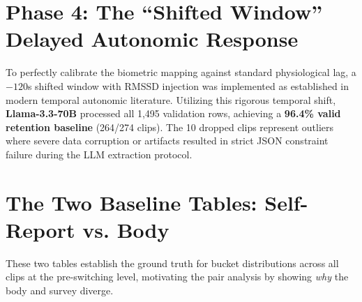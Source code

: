 \documentclass[11pt, a4paper]{report}
\begin{document}
\section{Phase 4: The ``Shifted Window'' Delayed Autonomic Response}

To perfectly calibrate the biometric mapping against standard physiological lag, a $-120$s shifted window with RMSSD injection was implemented as established in modern temporal autonomic literature. Utilizing this rigorous temporal shift, \textbf{Llama-3.3-70B} processed all 1,495 validation rows, achieving a \textbf{96.4\% valid retention baseline} (264/274 clips). The 10 dropped clips represent outliers where severe data corruption or artifacts resulted in strict JSON constraint failure during the LLM extraction protocol.


\section{The Two Baseline Tables: Self-Report vs. Body}
\label{sec:results-basetables}

These two tables establish the ground truth for bucket distributions across all clips at the pre-switching level, motivating the pair analysis by showing \textit{why} the body and survey diverge.
\end{document}
